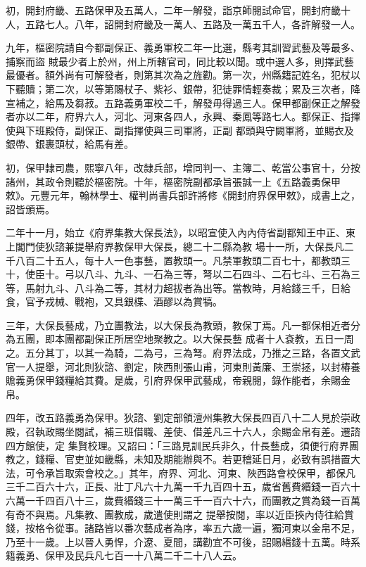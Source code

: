 \begin{pinyinscope}
 初，開封府畿、五路保甲及五萬人，二年一解發，詣京師閱試命官，開封府畿十人，五路七人。八年，詔開封府畿及一萬人、五路及一萬五千人，各許解發一人。



 九年，樞密院請自今都副保正、義勇軍校二年一比選，縣考其訓習武藝及等最多、捕察而盜
 賊最少者上於州，州上所轄官司，同比較以聞。或中選人多，則擇武藝最優者。額外尚有可解發者，則第其次為之旌勸。第一次，州縣籍記姓名，犯杖以下聽贖；第二次，以等第賜杖子、紫衫、銀帶，犯徒罪情輕奏裁；累及三次者，降宣補之，給馬及芻菽。五路義勇軍校二千，解發毋得過三人。保甲都副保正之解發者亦以二年，府界六人，河北、河東各四人，永興、秦鳳等路七人。都保正、指揮使與下班殿侍，副保正、副指揮使與三司軍將，正副
 都頭與守闕軍將，並賜衣及銀帶、銀裹頭杖，給馬有差。



 初，保甲隸司農，熙寧八年，改隸兵部，增同判一、主簿二、乾當公事官十，分按諸州，其政令則聽於樞密院。十年，樞密院副都承旨張誠一上《五路義勇保甲敕》。元豐元年，翰林學士、權判尚書兵部許將修《開封府界保甲敕》，成書上之，詔皆頒焉。



 二年十一月，始立《府界集教大保長法》，以昭宣使入內內侍省副都知王中正、東上閣門使狄諮兼提舉府界教保甲大保長，總二十二縣為教
 場十一所，大保長凡二千八百二十五人，每十人一色事藝，置教頭一。凡禁軍教頭二百七十，都教頭三十，使臣十。弓以八斗、九斗、一石為三等，弩以二石四斗、二石七斗、三石為三等，馬射九斗、八斗為二等，其材力超拔者為出等。當教時，月給錢三千，日給食，官予戎械、戰袍，又具銀楪、酒醪以為賞犒。



 三年，大保長藝成，乃立團教法，以大保長為教頭，教保丁焉。凡一都保相近者分為五團，即本團都副保正所居空地聚教之。以大保長藝
 成者十人袞教，五日一周之。五分其丁，以其一為騎，二為弓，三為弩。府界法成，乃推之三路，各置文武官一人提舉，河北則狄諮、劉定，陜西則張山甫，河東則黃廉、王崇拯，以封樁養贍義勇保甲錢糧給其費。是歲，引府界保甲武藝成，帝親閱，錄作能者，余賜金帛。



 四年，改五路義勇為保甲。狄諮、劉定部領澶州集教大保長四百八十二人見於崇政殿，召執政賜坐閱試，補三班借職、差使、借差凡三十六人，余賜金帛有差。遷諮四方館使，定
 集賢校理。又詔曰：「三路見訓民兵非久，什長藝成，須便行府界團教之，錢糧、官吏並如畿縣，未知及期能辦與不。若更稽延日月，必致有誤措置大法，可令承旨取索會校之。」其年，府界、河北、河東、陜西路會校保甲，都保凡三千二百六十六，正長、壯丁凡六十九萬一千九百四十五，歲省舊費緡錢一百六十六萬一千四百八十三，歲費緡錢三十一萬三千一百六十六，而團教之賞為錢一百萬有奇不與焉。凡集教、團教成，歲遣使則謂之
 提舉按閱，率以近臣挾內侍往給賞錢，按格令從事。諸路皆以番次藝成者為序，率五六歲一遍，獨河東以金帛不足，乃至十一歲。上以晉人勇悍，介遼、夏間，講勸宜不可後，詔賜緡錢十五萬。時系籍義勇、保甲及民兵凡七百一十八萬二千二十八人云。




\end{pinyinscope}
